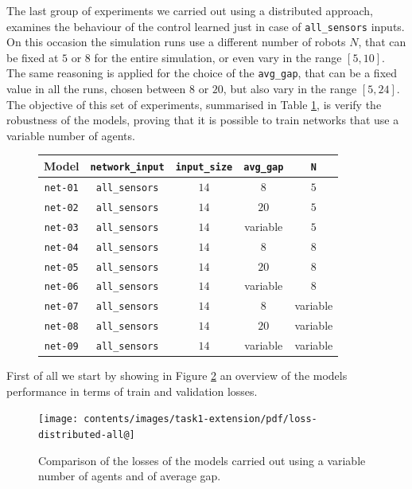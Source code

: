 The last group of experiments we carried out using a distributed approach, 
examines the behaviour of the control learned just in case of \texttt{all\_sensors} 
inputs. On this occasion the simulation runs use a different number of robots $N$, 
that can be fixed at $5$ or $8$ for the entire simulation, or even vary in the range 
$[5, 10]$. The same reasoning is applied for the choice of the \texttt{avg\_gap}, 
that can be a fixed value in all the runs, chosen between $8$ or $20$, but also 
vary in the range $[5, 24]$. 
The objective of this set of experiments, summarised in Table \ref{tab:modeldist}, 
is verify the robustness of the models, proving that it is possible to train networks 
that use a variable number of agents. 
\begin{figure}[!htb]
	\centering
	\begin{tabular}{ccccc}
		\toprule
		\textbf{Model} \quad & \textbf{\texttt{network\_input}} & 
		\textbf{\texttt{input\_size}} & \textbf{\texttt{avg\_gap}} & \textbf{\texttt{N}}\\
		\midrule
		\texttt{net-01} 	& \texttt{all\_sensors}		&  $14$  &  $8$		 	 &	 
		$5$ \\
		\texttt{net-02} 	& \texttt{all\_sensors}		&  $14$  &  $20$		&	$5$ \\
		\texttt{net-03} 	& \texttt{all\_sensors}		&  $14$  &  variable   &	
		$5$ \\
		\texttt{net-04} 	& \texttt{all\_sensors}	  	&  $14$  &  $8$			 &	  $8$ \\
		\texttt{net-05} 	& \texttt{all\_sensors}	  	&  $14$  &  $20$   		&	 $8$ \\
		\texttt{net-06} 	& \texttt{all\_sensors}	  	&  $14$  &  variable	&	 $8$ \\
		\texttt{net-07} 	& \texttt{all\_sensors}	  	&  $14$  &  $ 8$		  &	 variable\\
		\texttt{net-08} 	& \texttt{all\_sensors}	  	&  $14$  &  $20$		 &	variable\\
		\texttt{net-09} 	& \texttt{all\_sensors}	  	&  $14$  &  variable	 &	variable\\
		\bottomrule
	\end{tabular}
	\label{tab:modeldist}
\end{figure}

First of all we start by showing in Figure \ref{fig:distlossext} an overview of 
the 
models performance in terms of train and validation losses. 
\begin{figure}[!htb]
	\centering
	\texttt{[image: contents/images/task1-extension/pdf/loss-distributed-all@]}%
	\caption[Comparison of losses of the second set of 
	experiments.]{Comparison 
	of the losses of the models carried out using a variable number of agents 
	and of 
	average gap.}
	\label{fig:distlossext}
\end{figure}

